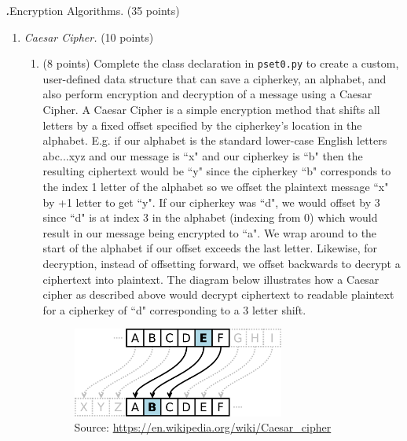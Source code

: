\documentclass[12pt]{amsart}
\newenvironment{statement}[1]{\smallskip\noindent\color[rgb]{0.0,0.0,0.0} {\bf #1.}}{}
\theoremstyle{definition}
\theoremstyle{remark}
\newcommand{\1}{\mathds{1}}
\begin{document}
\newpage
\begin{statement}{4}
\emph{Encryption Algorithms.} (35 points)
\begin{enumerate}
    \item \textit{Caesar Cipher.} (10 points)
        \begin{enumerate}
            \item (8 points) Complete the class declaration in \texttt{pset0.py} to create a custom, user-defined data structure that can save a cipherkey, an alphabet, and also perform encryption and decryption of a message using a Caesar Cipher. A Caesar Cipher is a simple encryption method that shifts all letters by a fixed offset specified by the cipherkey's location in the alphabet. E.g. if our alphabet is the standard lower-case English letters abc...xyz and our message is ``x" and our cipherkey is ``b" then the resulting ciphertext would be ``y" since the cipherkey ``b" corresponds to the index 1 letter of the alphabet so we offset the plaintext message ``x" by +1 letter to get ``y". If our cipherkey was ``d", we would offset by 3 since ``d" is at index 3 in the alphabet (indexing from 0) which would result in our message being encrypted to ``a". We wrap around to the start of the alphabet if our offset exceeds the last letter. Likewise, for decryption, instead of offsetting forward, we offset backwards to decrypt a ciphertext into plaintext. The diagram below illustrates how a Caesar cipher as described above would decrypt ciphertext to readable plaintext for a cipherkey of ``d" corresponding to a 3 letter shift.
        
        
        \begin{figure}[H]
            \centering
            \includegraphics[width=0.7\textwidth]{images/caesar_cipher.png}
            \caption{Source:  \href{https://en.wikipedia.org/wiki/Caesar\_cipher}{https://en.wikipedia.org/wiki/Caesar\_cipher}}
        \end{figure}
        

\end{enumerate}
\end{enumerate}
\end{statement}
\end{document}

